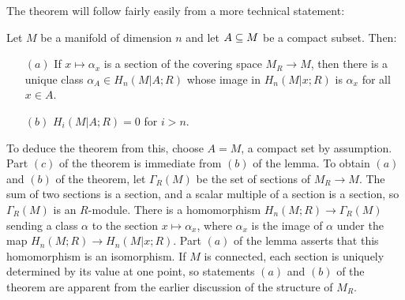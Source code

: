 The theorem will follow fairly easily from a more technical statement:
\begin{lemma}\label{orientation lem}
Let $M$ be a manifold of dimension $n$ and let $A\subseteq M$ be a compact subset. Then:
\begin{itemize}
\item[$(a)$]If $x\mapsto\alpha_x$ is a section of the covering space $M_R\to M$, then there is a unique class $\alpha_A\in H_n(M|A;R)$ whose image in $H_n(M|x;R)$ is $\alpha_x$ for all $x\in A$.
\item[$(b)$]$H_i(M|A;R)=0$ for $i>n$.
\end{itemize}
\end{lemma}
To deduce the theorem from this, choose $A=M$, a compact set by assumption.
Part $(c)$ of the theorem is immediate from $(b)$ of the lemma. To obtain $(a)$ and $(b)$ of the theorem, let $\Gamma_R(M)$ be the set of sections of $M_R\to M$. The sum of two sections is a section, and a scalar multiple of a section is a section, so $\Gamma_R(M)$ is an $R$-module. There is a homomorphism $H_n(M;R)\to\Gamma_R(M)$ sending a class $\alpha$ to the section $x\mapsto\alpha_x$, where $\alpha_x$ is the image of $\alpha$ under the map $H_n(M;R)\to H_n(M|x;R)$. Part $(a)$ of the lemma asserts that this homomorphism is an isomorphism. If $M$ is connected, each section is uniquely determined by its value at one point, so statements $(a)$ and $(b)$ of the theorem are apparent from the earlier discussion of the structure of $M_R$.
